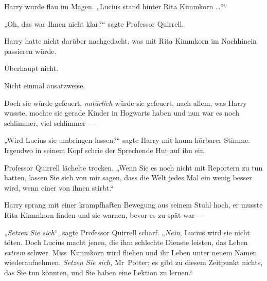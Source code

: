 Harry wurde flau im Magen.
„Lucius stand hinter Rita Kimmkorn …?“

„Oh, das war Ihnen nicht klar?“ sagte Professor Quirrell.

Harry hatte nicht darüber nachgedacht, was mit Rita Kimmkorn im Nachhinein passieren würde.

Überhaupt nicht.

Nicht einmal ansatzweise.

Doch sie würde gefeuert, \emph{natürlich} würde sie gefeuert, nach allem, was Harry wusste, mochte sie gerade Kinder in Hogwarts haben und nun war es noch schlimmer, viel schlimmer —

„Wird Lucius sie umbringen lassen?“ sagte Harry mit kaum hörbarer Stimme. Irgendwo in seinem Kopf schrie der Sprechende Hut auf ihn ein.

Professor Quirrell lächelte trocken.
„Wenn Sie es noch nicht mit Reportern zu tun hatten, lassen Sie sich von mir sagen, dass die Welt jedes Mal ein wenig besser wird, wenn einer von ihnen stirbt.“

Harry sprang mit einer krampfhaften Bewegung aus seinem Stuhl hoch, er musste Rita Kimmkorn finden und sie warnen, bevor es zu spät war —

„\emph{Setzen Sie sich}“, sagte Professor Quirrell scharf.
„\emph{Nein}, Lucius wird sie nicht töten. Doch Lucius macht jenen, die ihm schlechte Dienste leisten, das Leben \emph{extrem} schwer. Miss~Kimmkorn wird fliehen und ihr Leben unter neuem Namen wiederaufnehmen. \emph{Setzen Sie sich,} Mr~Potter; es gibt zu diesem Zeitpunkt nichts, das Sie tun könnten, und Sie haben eine Lektion zu lernen.“

